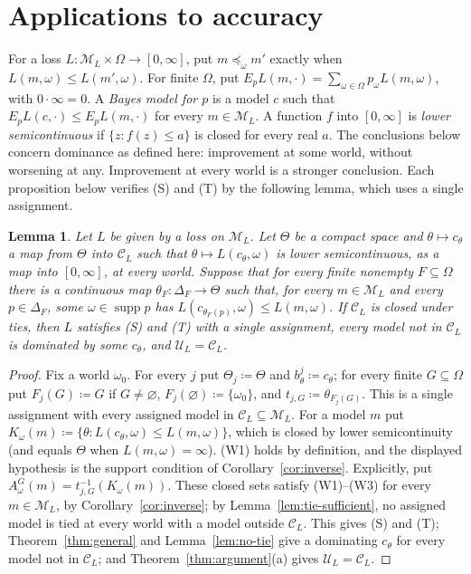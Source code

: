 \documentclass[11pt]{article}
\newtheorem{lemma}[theorem]{Lemma}
\theoremstyle{definition}
\theoremstyle{remark}
\newcommand{\M}{\mathcal M}
\newcommand{\C}{\mathcal C}
\newcommand{\U}{\mathcal U}
\newcommand{\supp}{\operatorname{supp}}
\begin{document}
\section{Applications to accuracy}\label{sec:short-applications}
For a loss $L:\M_L\times\Omega\to[0,\infty]$, put $m\preceq_\omega m'$ exactly when $L(m,\omega)\le L(m',\omega)$. For finite $\Omega$, put $E_pL(m,\cdot)=\sum_{\omega\in\Omega}p_\omega L(m,\omega)$, with $0\cdot\infty=0$. A \emph{Bayes model for $p$} is a model $c$ such that $E_pL(c,\cdot)\le E_pL(m,\cdot)$ for every $m\in\M_L$. A function $f$ into $[0,\infty]$ is \emph{lower semicontinuous} if $\{z:f(z)\le a\}$ is closed for every real $a$. The conclusions below concern dominance as defined here: improvement at some world, without worsening at any. Improvement at every world is a stronger conclusion. {\color{red}Each proposition below verifies {\color{red}(S)} and {\color{red}(T)} by the following lemma, which uses a single assignment.}

\begingroup\color{red}
\begin{lemma}\label{lem:loss-selection}
Let $L$ be given by a loss on $\M_L$. Let $\Theta$ be a compact space and $\theta\mapsto c_\theta$ a map from $\Theta$ into $\C_L$ such that $\theta\mapsto L(c_\theta,\omega)$ is lower semicontinuous, as a map into $[0,\infty]$, at every world. Suppose that for every finite nonempty $F\subseteq\Omega$ there is a continuous map $\theta_F:\Delta_F\to\Theta$ such that, for every $m\in\M_L$ and every $p\in\Delta_F$, some $\omega\in\supp p$ has $L(c_{\theta_F(p)},\omega)\le L(m,\omega)$. If $\C_L$ is closed under ties, {\color{red}then $L$ satisfies (S) and (T) with a single assignment}, every model not in $\C_L$ is dominated by some $c_\theta$, and $\U_L=\C_L$.
\end{lemma}
\begin{proof}
Fix a world $\omega_0$. For every $j$ put $\Theta_j\coloneqq\Theta$ and $b^j_\theta\coloneqq c_\theta$; for every finite $G\subseteq\Omega$ put $F_j(G)\coloneqq G$ if $G\ne\varnothing$, $F_j(\varnothing)\coloneqq\{\omega_0\}$, and $t_{j,G}\coloneqq\theta_{F_j(G)}$. This is a single assignment with every assigned model in $\C_L\subseteq\M_L$. For a model $m$ put $K_\omega(m)\coloneqq\{\theta:L(c_\theta,\omega)\le L(m,\omega)\}$, which is closed by lower semicontinuity (and equals $\Theta$ when $L(m,\omega)=\infty$). (W1) holds by definition, and the displayed hypothesis is the support condition of Corollary~\ref{cor:inverse}. Explicitly, put $A^G_\omega(m)=t_{j,G}^{-1}(K_\omega(m))$. These closed sets satisfy (W1)--(W3) for every $m\in\M_L$, by Corollary~\ref{cor:inverse}; {\color{red}by Lemma~\ref{lem:tie-sufficient}, no assigned model is tied at every world with a model outside $\C_L$. This gives (S) and (T);} Theorem~\ref{thm:general} {\color{red}and Lemma~\ref{lem:no-tie} give} a dominating $c_\theta$ for every model not in $\C_L$; and Theorem~\ref{thm:argument}(a) gives $\U_L=\C_L$.
\end{proof}
\endgroup
\end{document}
